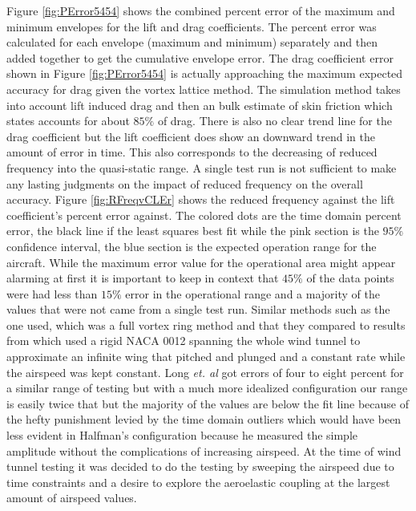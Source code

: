 \documentclass[11pt]{ucthesis}
\begin{document}
Figure \ref{fig:PError5454} shows the combined percent error of the maximum and minimum envelopes for the lift and drag coefficients. The percent error was calculated for each envelope (maximum and minimum) separately and then added together to get the cumulative envelope error. The drag coefficient error shown in Figure \ref{fig:PError5454} is actually approaching the maximum expected accuracy for drag given the vortex lattice method. The simulation method takes into account lift induced drag and then an bulk estimate of skin friction which \cite{thomas1985aircraft} states accounts for about $85\%$ of drag. There is also no clear trend line for the drag coefficient but the lift coefficient does show an downward trend in the amount of error in time. This also corresponds to the decreasing of reduced frequency into the quasi-static range. A single test run is not sufficient to make any lasting judgments on the impact of reduced frequency on the overall accuracy. Figure \ref{fig:RFreqvCLEr} shows the reduced frequency against the lift coefficient's percent error against. The colored dots are the time domain percent error, the black line if the least squares best fit while the pink section is the $95\%$ confidence interval, the blue section is the expected operation range for the aircraft. While the maximum error value for the operational area might appear alarming at first it is important to keep in context that $45\%$ of the data points were had less than $15\%$ error in the operational range and a majority of the values that were not came from a single test run. Similar methods such as the one \cite{long2004object} used, which was a full vortex ring method and that they compared to results from \cite{halfman1952experimental} which used a rigid NACA 0012 spanning the whole wind tunnel to approximate an infinite wing that pitched and plunged and a constant rate while the airspeed was kept constant. Long {\it et. al} got errors of four to eight percent for a similar range of testing but with a much more idealized configuration our range is easily twice that but the majority of the values are below the fit line because of the hefty punishment levied by the time domain outliers which would have been less evident in Halfman's configuration because he measured the simple amplitude without the complications of increasing airspeed. At the time of wind tunnel testing it was decided to do the testing by sweeping the airspeed due to time constraints and a desire to explore the aeroelastic coupling at the largest amount of airspeed values.
\end{document}
